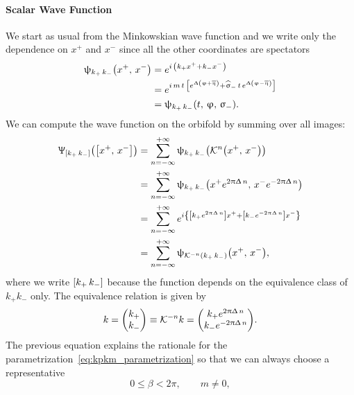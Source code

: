 \paragraph{Scalar Wave Function}

We start as usual from the Minkowskian wave function and we write only the dependence on $x^+$ and $x^-$ since all the other coordinates are spectators
\begin{equation}
  \begin{split}
    \psi_{k_+\, k_-}\qty(x^+,\, x^-)
    & =
    e^{i\, \qty( k_+ x^+ + k_- x^- )}
    \\
    & =
    e^{%
      i\, m\, t\, \qty[%
        e^{\Delta \qty( \varphi + \beta )} + \hsigma_-\, t\, e^{\Delta \qty( \varphi - \beta )}
      ]
    }
    \\
    & =
    \psi_{k_+\, k_-}\qty(t,\, \varphi,\, \sigma_-).
  \end{split}
\end{equation}
We can compute the wave function on the orbifold by summing over all images:
\begin{equation}
  \begin{split}
    \Psi_{\qty[k_+\, k_-]}\qty(\qty[x^+,\, x^-])
    & =
    \infinfsum{n}
    \psi_{k_+\, k_-}\qty( \cK^n \qty(x^+,\, x^-))
    \\
    & =
    \infinfsum{n}
    \psi_{k_+\, k_-}\qty(x^+ e^{2\pi\Delta\,n},\, x^- e^{-2\pi\Delta\,n})
    \\
    & =
    \infinfsum{n}
    e^{%
      i \qty{%
        \qty[ k_+ e^{2\pi\Delta\,n} ] x^+ + \qty[ k_- e^{-2\pi\Delta\,n} ] x^-
      }
    }
    \\
    & =
    \infinfsum{n}
    \psi_{\cK^{-n}\qty( k_+\, k_-)}\qty( x^+,\, x^- ),
  \end{split}
\end{equation}
where we write $\qty[k_+\, k_-]$ because the function depends on the equivalence class of $k_+ k_-$ only.
The equivalence relation is given by
\begin{equation}
  k
  =
  \mqty( k_+ \\ k_- )
  \equiv
  \cK^{-n} k
  =
  \mqty( k_+ e^{2\pi\Delta\,n} \\ k_- e^{-2\pi\Delta\,n} ).
  \label{eq:BO_kpkp_equivalence}
\end{equation}
The previous equation explains the rationale for the parametrization~\eqref{eq:kpkm_parametrization} so that we can always choose a representative 
\begin{equation}
  0 \le \beta < 2 \pi, \qquad m \neq 0,
\end{equation}
